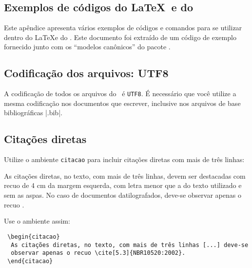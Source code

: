 \documentclass[12pt,oneside,a4paper,chapter=TITLE,
			   english,brazil]{abntex2}
\begin{document}
% 

\begin{anexosenv}


\chapter{Exemplos de códigos do \LaTeX\ e do \abnTeX}
\label{exemplos}

Este apêndice apresenta vários exemplos de códigos e comandos para se utilizar dentro do \LaTeX e do \abnTeX. Este documento foi extraído de um código de exemplo fornecido junto com os ``modelos canônicos'' do pacote \abnTeX.


\section{Codificação dos arquivos: UTF8}

A codificação de todos os arquivos do \abnTeX\ é \texttt{UTF8}. É necessário que você utilize a mesma codificação nos documentos que escrever, inclusive nos arquivos de base bibliográficas |.bib|.

\section{Citações diretas}
\label{sec-citacao}

Utilize o ambiente \texttt{citacao} para incluir citações diretas com mais de três linhas:
\begin{citacao}
  As citações diretas, no texto, com mais de três linhas, devem ser destacadas com recuo de 4 cm da margem esquerda, com letra menor que a do texto utilizado e sem as aspas. No caso de documentos datilografados, deve-se observar apenas o recuo \cite[5.3]{NBR10520:2002}.
\end{citacao}

Use o ambiente assim:
\begin{verbatim}
 \begin{citacao}
  As citações diretas, no texto, com mais de três linhas [...] deve-se
  observar apenas o recuo \cite[5.3]{NBR10520:2002}.
 \end{citacao}
\end{verbatim}


\end{anexosenv}
\end{document}
